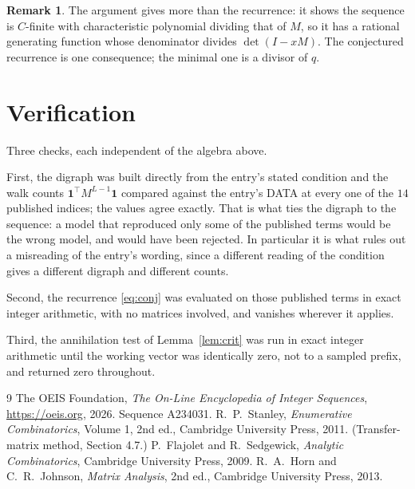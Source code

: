 \documentclass[11pt,a4paper]{article}
\theoremstyle{plain}
\theoremstyle{definition}
\newtheorem{remark}[theorem]{Remark}
\begin{document}
\begin{remark}
The argument gives more than the recurrence: it shows the sequence is $C$-finite with
characteristic polynomial dividing that of $M$, so it has a rational generating function
whose denominator divides $\det(I-xM)$. The conjectured recurrence is one consequence; the
minimal one is a divisor of $q$.
\end{remark}

\section{Verification}

Three checks, each independent of the algebra above.

First, the digraph was built directly from the entry's stated condition and the walk counts
$\mathbf{1}^{\!\top}M^{L-1}\mathbf{1}$ compared against the entry's DATA at
every one of the $14$ published indices; the values agree exactly. That is what ties
the digraph to the sequence: a model that reproduced only some of the published terms would
be the wrong model, and would have been rejected. In particular it is what rules out a
misreading of the entry's wording, since a different reading of the condition gives a
different digraph and different counts.

Second, the recurrence \eqref{eq:conj} was evaluated on those published terms in exact
integer arithmetic, with no matrices involved, and vanishes wherever it applies.

Third, the annihilation test of Lemma~\ref{lem:crit} was run in exact integer arithmetic
until the working vector was identically zero, not to a sampled prefix, and returned zero
throughout.

\begin{thebibliography}{9}
 The OEIS Foundation, \emph{The On-Line Encyclopedia of Integer
Sequences}, \url{https://oeis.org}, 2026. Sequence A234031.
 R.~P.~Stanley, \emph{Enumerative Combinatorics}, Volume 1, 2nd ed.,
Cambridge University Press, 2011. (Transfer-matrix method, Section 4.7.)
 P.~Flajolet and R.~Sedgewick, \emph{Analytic Combinatorics}, Cambridge
University Press, 2009.
 R.~A.~Horn and C.~R.~Johnson, \emph{Matrix Analysis}, 2nd ed., Cambridge
University Press, 2013.
\end{thebibliography}
\end{document}
